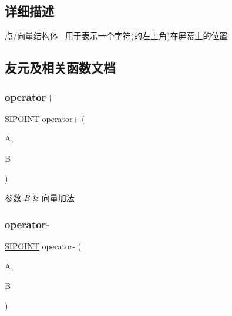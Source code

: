 \subsection{详细描述}
点/向量结构体~\newline
用于表示一个字符(的左上角)在屏幕上的位置 

\subsection{友元及相关函数文档}
\mbox{\label{struct_s_i_p_o_i_n_t_abd9be7eb5a981ba5d72d548a32052a01}} 
\subsubsection{\texorpdfstring{operator+}{operator+}}
{\footnotesize\ttfamily \hyperlink{struct_s_i_p_o_i_n_t}{S\+I\+P\+O\+I\+NT} operator+ (\begin{DoxyParamCaption}\item[{const \hyperlink{struct_s_i_p_o_i_n_t}{S\+I\+P\+O\+I\+NT} \&}]{A,  }\item[{const \hyperlink{struct_s_i_p_o_i_n_t}{S\+I\+P\+O\+I\+NT} \&}]{B }\end{DoxyParamCaption})\hspace{0.3cm}{\ttfamily [friend]}}


\begin{DoxyParams}{参数}
{\em B} & 向量加法 \\
\hline
\end{DoxyParams}
\mbox{\label{struct_s_i_p_o_i_n_t_a1138454683665c35746e210cbf614306}} 
\subsubsection{\texorpdfstring{operator-\/}{operator-}}
{\footnotesize\ttfamily \hyperlink{struct_s_i_p_o_i_n_t}{S\+I\+P\+O\+I\+NT} operator-\/ (\begin{DoxyParamCaption}\item[{const \hyperlink{struct_s_i_p_o_i_n_t}{S\+I\+P\+O\+I\+NT} \&}]{A,  }\item[{const \hyperlink{struct_s_i_p_o_i_n_t}{S\+I\+P\+O\+I\+NT} \&}]{B }\end{DoxyParamCaption})\hspace{0.3cm}{\ttfamily [friend]}}


